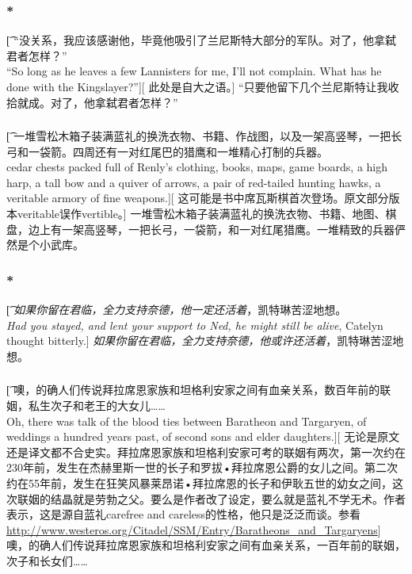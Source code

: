 \documentclass[12pt,a4paper]{article}
\begin{document}
\subsubsection{\color{red}*}\t[
	“没关系，我应该感谢他，毕竟他吸引了兰尼斯特大部分的军队。对了，他拿弑君者怎样？”\\
	“So long as he leaves a few Lannisters for me, I'll not complain. What has he done with the Kingslayer?”][
	此处是自大之语。]
	“只要他留下几个兰尼斯特让我收拾就成。对了，他拿弑君者怎样？”
	
\subsubsection{}\t[
	一堆雪松木箱子装满蓝礼的换洗衣物、书籍、作战图，以及一架高竖琴，一把长弓和一袋箭。四周还有一对红尾巴的猎鹰和一堆精心打制的兵器。\\
	cedar chests packed full of Renly's clothing, books, maps, game boards, a high harp, a tall bow and a quiver of arrows, a pair of red-tailed hunting hawks, a veritable armory of fine weapons.][
	这可能是书中席瓦斯棋首次登场。原文部分版本veritable误作vertible。]
	一堆雪松木箱子装满蓝礼的换洗衣物、书籍、地图、棋盘，边上有一架高竖琴，一把长弓，一袋箭，和一对红尾猎鹰。一堆精致的兵器俨然是个小武库。
	
\subsubsection{\color{red}*}\t[
	\emph{如果你留在君临，全力支持奈德，他一定还活着}，凯特琳苦涩地想。\\
	\emph{Had you stayed, and lent your support to Ned, he might still be alive}, Catelyn thought bitterly.]
	\emph{如果你留在君临，全力支持奈德，他或许还活着}，凯特琳苦涩地想。
	
\subsubsection{}\t[
	噢，的确人们传说拜拉席恩家族和坦格利安家之间有血亲关系，数百年前的联姻，私生次子和老王的大女儿……\\
	Oh, there was talk of the blood ties between Baratheon and Targaryen, of weddings a hundred years past, of second sons and elder daughters.][
	无论是原文还是译文都不合史实。拜拉席恩家族和坦格利安家可考的联姻有两次，第一次约在230年前，发生在杰赫里斯一世的长子和罗拔•拜拉席恩公爵的女儿之间。第二次约在55年前，发生在狂笑风暴莱昂诺•拜拉席恩的长子和伊耿五世的幼女之间，这次联姻的结晶就是劳勃之父。要么是作者改了设定，要么就是蓝礼不学无术。作者表示，这是源自蓝礼carefree and careless的性格，他只是泛泛而谈。参看\url{http://www.westeros.org/Citadel/SSM/Entry/Baratheons_and_Targaryens}]
	噢，的确人们传说拜拉席恩家族和坦格利安家之间有血亲关系，一百年前的联姻，次子和长女们……
\end{document}
